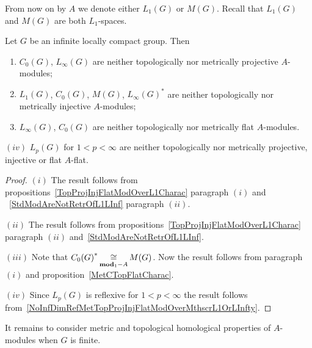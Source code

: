 From now on by $A$ we denote either $L_1(G)$ or $M(G)$. Recall that $L_1(G)$ and
$M(G)$ are both $L_1$-spaces.

\begin{proposition}\label{StdModAreNotL1MGMetTopProjInjFlat} Let $G$ be an
infinite locally compact group. Then

\begin{enumerate}[label = (\roman*)]
    \item $C_0(G)$, $L_\infty(G)$ are neither topologically nor metrically 
    projective $A$-modules;

    \item $L_1(G)$, $C_0(G)$, $M(G)$, ${L_\infty(G)}^*$ are neither 
    topologically nor metrically injective $A$-modules;

    \item $L_\infty(G)$, $C_0(G)$ are neither topologically nor metrically flat
    $A$-modules.
\end{enumerate}
\end{proposition}

$(iv)$ $L_p(G)$ for $1<p<\infty$ are neither topologically nor metrically
projective, injective or flat $A$-flat.

\begin{proof} $(i)$ The result follows from
propositions~\ref{TopProjInjFlatModOverL1Charac} paragraph $(i)$ and
~\ref{StdModAreNotRetrOfL1LInf} paragraph $(ii)$.

$(ii)$ The result follows from propositions~\ref{TopProjInjFlatModOverL1Charac}
paragraph $(ii)$ and~\ref{StdModAreNotRetrOfL1LInf}.

$(iii)$ Note that ${C_0(G)}^*\mathop{\mathbin{\cong}}\limits_{\mathbf{mod}_1-A}M(G)$. Now the result 
follows from paragraph $(i)$ and proposition~\ref{MetCTopFlatCharac}.

$(iv)$ Since $L_p(G)$ is reflexive for $1<p<\infty$ the result follows
from~\ref{NoInfDimRefMetTopProjInjFlatModOverMthscrL1OrLInfty}.
\end{proof}

It remains to consider metric and topological homological properties of
$A$-modules when $G$ is finite.

